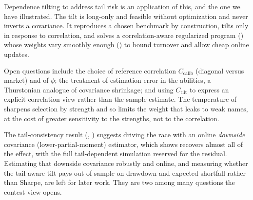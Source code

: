 Dependence tilting to address tail risk is an application of this, and the one we
have illustrated. The tilt is long-only and feasible without optimization and never
inverts a covariance. It reproduces a chosen benchmark by construction, tilts only in
response to correlation, and solves a correlation-aware regularized program
() whose weights vary smoothly enough () to
bound turnover and allow cheap online updates.

Open questions include the choice of reference correlation $C_{\mathrm{calib}}$
(diagonal versus market) and of $\phi$; the treatment of estimation error in the
abilities, a Thurstonian analogue of covariance shrinkage; and using
$C_{\mathrm{tilt}}$ to express an explicit correlation view rather than the sample
estimate. The temperature of  sharpens selection by strength
and so limits the weight that leaks to weak names, at the cost of greater
sensitivity to the strengths, not to the correlation.

The tail-consistency result (, ) suggests driving
the race with an online \emph{downside} covariance (lower-partial-moment) estimator,
which  shows recovers almost all of the effect, with the full
tail-dependent simulation reserved for the residual. Estimating that downside covariance robustly and online, and measuring whether
the tail-aware tilt pays out of sample on drawdown and expected shortfall rather
than Sharpe, are left for later work. They are two among many questions the
contest view opens.

